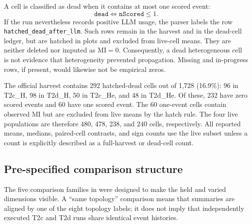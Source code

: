 A cell is classified as dead when it contains at most one scored event:
\[
  \texttt{dead}\iff \texttt{nScored}\leq 1.
\]
If the run nevertheless records positive LLM usage, the parser labels the row
\texttt{hatched\_dead\_after\_llm}.  Such rows remain in the harvest and in the dead-cell
ledger, but are hatched in plots and excluded from live-cell means.  They are neither
deleted nor imputed as \(\mathrm{MI}=0\).  Consequently, a dead heterogeneous cell is
not evidence that heterogeneity prevented propagation.  Missing and in-progress rows,
if present, would likewise not be empirical zeros.

The official harvest contains 292 hatched-dead cells out of 1,728 (16.9\%): 96 in
T2c\_H, 98 in T2d\_H, 50 in T2c\_He, and 48 in T2d\_He. Of these, 232 have
zero scored events and 60 have one scored event. The 60 one-event cells
contain observed MI but are excluded from live means by the hatch rule. The
four live populations are
therefore 480, 478, 238, and 240 cells, respectively.  All reported means, medians,
paired-cell contrasts, and sign counts use the live subset unless a count is
explicitly described as a full-harvest or dead-cell count.

\subsection{Pre-specified comparison structure}
\label{sec:mm-comparisons}

The five comparison families in  were designed to make the held and varied dimensions
visible.  A ``same topology'' comparison means that summaries are aligned by one of
the eight topology labels; it does not imply that independently executed T2c and T2d
runs share identical event histories.

